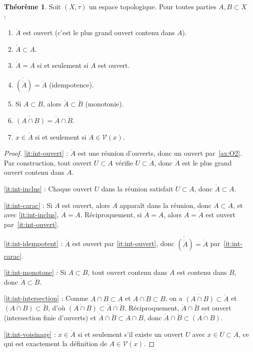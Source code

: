 \documentclass[12pt,a4paper,openany]{book}
\theoremstyle{definition}
\theoremstyle{cours}
\newtheorem{theoreme}{Théorème}[chapter]
\theoremstyle{coursnormal}
\newcommand{\Int}[1]{\mathring{#1}}
\newcommand{\Vois}[1]{\mathcal{V}(#1)}
\begin{document}
\begin{theoreme}\label{thm:proprietes-interieur}
  Soit $(X,\tau)$ un espace topologique. Pour toutes parties $A, B \subset X$ :
  \begin{enumerate}[label=(\roman*)]
    \item\label{it:int-ouvert} $\Int{A}$ est ouvert (c'est le plus grand ouvert contenu dans $A$).
    \item\label{it:int-inclus} $\Int{A} \subset A$.
    \item\label{it:int-carac} $\Int{A} = A$ si et seulement si $A$ est ouvert.
    \item\label{it:int-idempotent} $\Int{(\Int{A})} = \Int{A}$ (idempotence).
    \item\label{it:int-monotone} Si $A \subset B$, alors $\Int{A} \subset \Int{B}$ (monotonie).
    \item\label{it:int-intersection} $\Int{(A \cap B)} = \Int{A} \cap \Int{B}$.
    \item\label{it:int-voisinage} $x \in \Int{A}$ si et seulement si $A \in \Vois{x}$.
  \end{enumerate}
\end{theoreme}

\begin{proof}
  \ref{it:int-ouvert} : $\Int{A}$ est une réunion d'ouverts, donc un ouvert par~\ref{ax:O2}. Par construction, tout ouvert $U \subset A$ vérifie $U \subset \Int{A}$, donc $\Int{A}$ est le plus grand ouvert contenu dans $A$.

  \ref{it:int-inclus} : Chaque ouvert $U$ dans la réunion satisfait $U \subset A$, donc $\Int{A} \subset A$.

  \ref{it:int-carac} : Si $A$ est ouvert, alors $A$ apparaît dans la réunion, donc $A \subset \Int{A}$, et avec \ref{it:int-inclus}, $\Int{A} = A$. Réciproquement, si $\Int{A} = A$, alors $A = \Int{A}$ est ouvert par~\ref{it:int-ouvert}.

  \ref{it:int-idempotent} : $\Int{A}$ est ouvert par \ref{it:int-ouvert}, donc $\Int{(\Int{A})} = \Int{A}$ par~\ref{it:int-carac}.

  \ref{it:int-monotone} : Si $A \subset B$, tout ouvert contenu dans $A$ est contenu dans $B$, donc $\Int{A} \subset \Int{B}$.

  \ref{it:int-intersection} : Comme $A \cap B \subset A$ et $A \cap B \subset B$, on a $\Int{(A \cap B)} \subset \Int{A}$ et $\Int{(A \cap B)} \subset \Int{B}$, d'où $\Int{(A \cap B)} \subset \Int{A} \cap \Int{B}$. Réciproquement, $\Int{A} \cap \Int{B}$ est ouvert (intersection finie d'ouverts) et $\Int{A} \cap \Int{B} \subset A \cap B$, donc $\Int{A} \cap \Int{B} \subset \Int{(A \cap B)}$.

  \ref{it:int-voisinage} : $x \in \Int{A}$ si et seulement s'il existe un ouvert $U$ avec $x \in U \subset A$, ce qui est exactement la définition de $A \in \Vois{x}$.
\end{proof}
\end{document}
